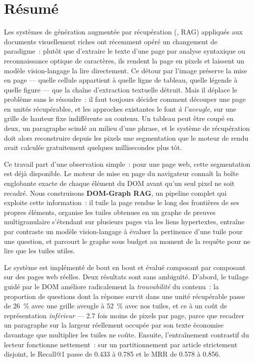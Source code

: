 \cleardoublepage
\chapter*{Résumé}

Les systèmes de génération augmentée par récupération (, RAG) appliqués aux documents visuellement riches ont récemment
opéré un changement de paradigme~: plutôt que d'extraire le texte d'une page
par analyse syntaxique ou reconnaissance optique de caractères, ils rendent la
page en pixels et laissent un modèle vision-langage la lire directement. Ce
détour par l'image préserve la mise en page --- quelle cellule appartient à
quelle ligne de tableau, quelle légende à quelle figure --- que la chaîne
d'extraction textuelle détruit. Mais il déplace le problème sans le résoudre~:
il faut toujours décider comment découper une page en unités récupérables, et
les approches existantes le font \emph{à l'aveugle}, sur une grille de hauteur
fixe indifférente au contenu. Un tableau peut être coupé en deux, un paragraphe
scindé au milieu d'une phrase, et le système de récupération doit alors
reconstruire depuis les pixels une segmentation que le moteur de rendu avait
calculée gratuitement quelques millisecondes plus tôt.

Ce travail part d'une observation simple~: pour une page web, cette
segmentation est déjà disponible. Le moteur de mise en page du navigateur
connaît la boîte englobante exacte de chaque élément du DOM avant qu'un seul
pixel ne soit recadré. Nous construisons \textbf{DOM-Graph RAG}, un pipeline
complet qui exploite cette information~: il tuile la page rendue le long des
frontières de ses propres éléments, organise les tuiles obtenues en un graphe
de preuves multigranulaire s'étendant sur plusieurs pages via les liens
hypertextes, entraîne par contraste un modèle vision-langage à évaluer la
pertinence d'une tuile pour une question, et parcourt le graphe sous budget au
moment de la requête pour ne lire que les tuiles utiles.

Le système est implémenté de bout en bout et évalué composant par composant sur
des pages web réelles. Deux résultats sont sans ambiguïté. D'abord, le tuilage
guidé par le DOM améliore radicalement la \emph{trouvabilité} du contenu~: la
proportion de questions dont la réponse survit dans une unité récupérable
passe de \SI{26}{\percent} avec une grille aveugle à \SI{52}{\percent} avec nos
tuiles, et ce à un coût de représentation \emph{inférieur} --- \num{2.7} fois
moins de pixels par page, parce que recadrer un paragraphe sur la largeur
réellement occupée par son texte économise davantage que multiplier les tuiles
ne coûte. Ensuite, l'entraînement contrastif du lecteur fonctionne nettement~:
sur un partitionnement par article strictement disjoint, le Recall@1 passe de
\num{0.433} à \num{0.785} et le MRR de \num{0.578} à \num{0.856}.

